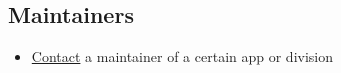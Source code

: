 \documentclass[letterpaper,10pt,english]{sphinxmanual}
\begin{document}
\subsection{Maintainers}
\label{commun/index:maintainers}\begin{itemize}
\item {} 
\href{https://owncloud.org/contact/}{Contact} a maintainer of a certain app or division

\end{itemize}



\renewcommand{\indexname}{Index}
\printindex
\end{document}
